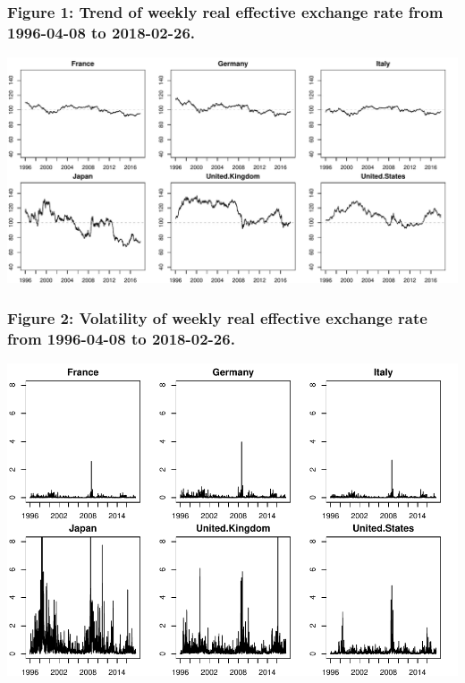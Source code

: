 \documentclass[]{elsarticle} %
\makeatletter
\def\maxwidth{\ifdim\Gin@nat@width>\linewidth\linewidth
\else\Gin@nat@width\fi}
\let\Oldincludegraphics\includegraphics
\renewcommand{\includegraphics}[1]{\Oldincludegraphics[width=\maxwidth]{#1}}
\makeatother
\begin{document}
\subsubsection{\texorpdfstring{\textbf{Figure 1: Trend of weekly real
effective exchange rate from 1996-04-08 to
2018-02-26.}}{Figure 1: Trend of weekly real effective exchange rate from 1996-04-08 to 2018-02-26.}}\label{figure-1-trend-of-weekly-real-effective-exchange-rate-from-1996-04-08-to-2018-02-26.}

\includegraphics{Main_files/figure-latex/unnamed-chunk-3-1.pdf}

\subsubsection{\texorpdfstring{\textbf{Figure 2: Volatility of weekly
real effective exchange rate from 1996-04-08 to
2018-02-26.}}{Figure 2: Volatility of weekly real effective exchange rate from 1996-04-08 to 2018-02-26.}}\label{figure-2-volatility-of-weekly-real-effective-exchange-rate-from-1996-04-08-to-2018-02-26.}

\includegraphics{Main_files/figure-latex/unnamed-chunk-4-1.pdf}
\end{document}
